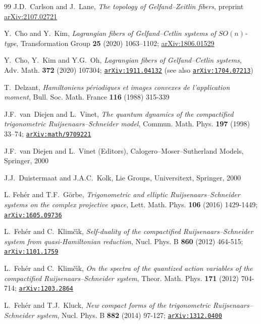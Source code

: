 \documentclass[a4paper,11pt,reqno]{amsart}
\theoremstyle{definition}
\numberwithin{equation}{section}
\begin{document}
\begin{thebibliography}{99}
J.D.~Carlson and J.~Lane,
{\it The topology of Gelfand–Zeitlin fibers}, preprint
\href{https://arxiv.org/abs/2107.02721}{arXiv:2107.02721}


Y.~Cho and Y.~Kim,
{\it Lagrangian fibers of Gelfand--Cetlin systems  of $SO(n)$-type},
Transformation Group {\bf 25} (2020) 1063–1102;
\href{https://arxiv.org/abs/1806.01529}{arXiv:1806.01529}

Y.~Cho, Y.~Kim and Y.G.~Oh,
{\it  Lagrangian fibers of Gelfand--Cetlin systems},
Adv. Math.  {\bf 372} (2020) 107304;
\href{https://arxiv.org/abs/1911.04132}{\tt arXiv:1911.04132}
(see also \href{https://arxiv.org/abs/1704.07213}{\tt arXiv:1704.07213})

T.~Delzant,
{\it  Hamiltoniens p\'eriodiques et images convexes de l’application moment},
 Bull. Soc. Math. France {\bf 116} (1988) 315-339


J.F.~van~Diejen and L.~Vinet,
{\it  The quantum dynamics of the compactified trigonometric Ruijsenaars--Schneider model},
 Commun. Math. Phys. {\bf 197} (1998) 33–74;
 \href{https://arxiv.org/abs/math/9709221}{\tt arXiv:math/9709221}

J.F.~van Diejen and L.~Vinet (Editors), Calogero--Moser--Sutherland Models, Springer, 2000

J.J.~Duistermaat and J.A.C.~Kolk,
Lie Groups, Universitext, Springer, 2000


 L. Feh\'er and T.F.~G\"orbe,
 {\it Trigonometric and elliptic Ruijsenaars--Schneider systems on the complex projective space},
 Lett. Math. Phys. {\bf 106} (2016) 1429-1449;
 \href{https://arxiv.org/abs/1605.09736}{\tt arXiv:1605.09736}

L.~Feh\'er and C.~Klim\v{c}\'\i k,
{\it Self-duality of the compactified Ruijsenaars--Schneider system from quasi-Hamiltonian reduction},
Nucl. Phys. B {\bf 860} (2012) 464-515;
\href{https://arxiv.org/abs/1101.1759}{\tt arXiv:1101.1759}

L.~Feh\'er and C.~Klim\v{c}\'\i k,
{\it On the spectra of the quantized action variables of the compactified Ruijsenaars--Schneider system},
Theor. Math. Phys. {\bf 171} (2012) 704-714;
\href{https://arxiv.org/abs/1203.2864}{\tt arXiv:1203.2864}


L.~Feh\'er and T.J.~Kluck,
{\it   New compact forms of the trigonometric Ruijsenaars--Schneider system},
Nucl. Phys. B {\bf 882} (2014) 97-127;
\href{https://arxiv.org/abs/1312.0400}{\tt arXiv:1312.0400}


\end{thebibliography}
\end{document}
